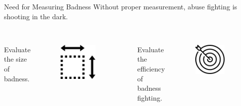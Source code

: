 \documentclass[nobackground,dvipsnames,table]{beamer}
\begin{document}
\begin{frame}{Need for Measuring Badness}
    \centering
    Without proper measurement, abuse fighting is shooting in the dark. \\~\\
    \begin{columns}[T]
        \small
            \centering
            Evaluate the size of badness.\\
            \begin{figure}
                \includegraphics[width=0.75\textwidth]{size-of-badness}
            \end{figure}
            \centering
            Evaluate the efficiency of badness fighting.\\
            \begin{figure}
                \includegraphics[width=0.75\textwidth]{efficiency-of-badness-fighting}

\end{figure}
\end{columns}
\end{frame}
\end{document}
